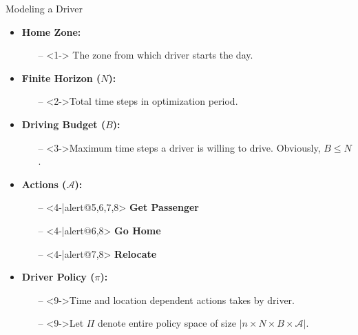 \begin{frame}{Modeling a Driver}
\begin{itemize}
	\item<1->\textcolor{BlueGreen}{\bf Home Zone:}
		\begin{itemize}
			\item[--]<1-> The zone from which driver starts the day.
		\end{itemize}
		\vspace{0.25cm}
	\item<2->\textcolor{BlueGreen}{\bf Finite Horizon ($N$):}
		\begin{itemize}
			\item[--]<2->Total time steps in optimization period.
		\end{itemize}
		\vspace{0.25cm}
	\item<3->\textcolor{BlueGreen}{\bf Driving Budget ($B$):}
		\begin{itemize}
			\item[--]<3->Maximum time steps a driver is willing to drive. Obviously, $B \leq N$.
		\end{itemize}
		\vspace{0.25cm}
	\item<4->\textcolor{BlueGreen}{\bf Actions ($\mathcal{A}$):}
		\begin{itemize}
			\item[--]<4-|alert@5,6,7,8> \textbf{Get Passenger} 
			\item[--]<4-|alert@6,8> \textbf{Go Home}
			\item[--]<4-|alert@7,8> \textbf{Relocate} 
		\end{itemize}
	\item<9->\textcolor{BlueGreen}{\bf Driver Policy ($\pi$):}
		\begin{itemize}
			\item[--]<9->Time and location dependent actions takes by driver.
			\item[--]<9->Let $\Pi$ denote entire policy space of size $\big|n \times N \times B \times \mathcal{A}\big|$.
		\end{itemize}
		
\end{itemize}
\end{frame}

